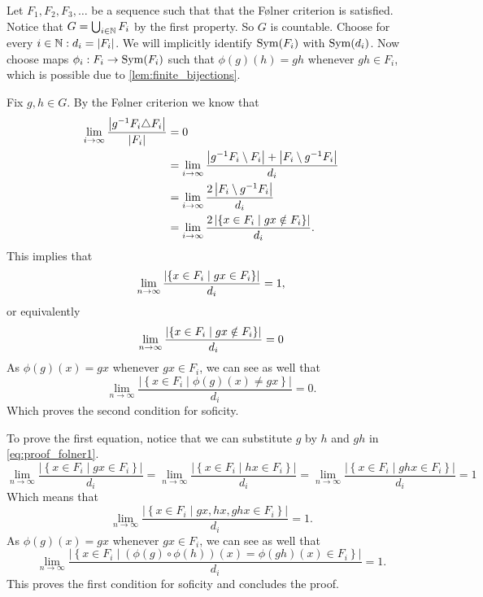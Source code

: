Let $F_1, F_2, F_3, \dots $ be a sequence such that that the Følner criterion is satisfied. Notice that $G = \bigcup_{i \in \mathbb{N}} F_i$ by the first property. So $G$ is countable. 
Choose for every $i \in \mathbb{N}: d_i = |F_i|$. We will implicitly identify $\operatorname{Sym}(F_i)$ with $\operatorname{Sym}(d_i)$. Now choose maps $\phi_i: F_i \to \operatorname{Sym}(F_i)$ such that $\phi(g)(h) = gh$ whenever $gh \in F_i$, which is possible due to \cref{lem:finite_bijections}. 

Fix $g, h \in G$. By the Følner criterion we know that 
\begin{align*}
    \lim_{i\to \infty} \frac{\left| g^{-1}F_i \triangle F_i \right|}{\left| F_i \right|} &= 0\\
    &= \lim_{i\to \infty} \frac{\left| g^{-1}F_i \setminus F_i \right| + \left| F_i \setminus g^{-1}F_i \right|}{d_i}\\
    &= \lim_{i\to \infty} \frac{2\left|  F_i \setminus g^{-1}F_i  \right|}{d_i}\\
    &= \lim_{i\to \infty} \frac{2\left| \left\{ x \in F_i \mid gx \notin F_i \right\} \right|}{d_i}. 
\end{align*}
This implies that \begin{equation}
    \lim_{n\to \infty} \frac{\left| \left\{ x \in F_i \mid gx \in F_i \right\} \right|}{d_i} = 1,
\end{equation}
or equivalently 
\begin{equation}\label{eq:proof_folner1}
    \lim_{n\to \infty} \frac{\left| \left\{ x \in F_i \mid gx \notin F_i \right\} \right|}{d_i} = 0
\end{equation}
As $\phi(g)(x) = gx$ whenever $gx \in F_i$, we can see as well that 
$$\lim_{n\to \infty} \frac{\left|\left\{ x \in F_i \mid \phi(g)(x)\ne gx \right\}\right|}{d_i} = 0.$$
Which proves the second condition for soficity. 

To prove the first equation, notice that we can substitute $g$ by $h$ and $gh$ in \cref{eq:proof_folner1}.
$$ \lim_{n\to \infty} \frac{\left|\left\{ x \in F_i \mid gx \in F_i \right\}\right|}{d_i} =
\lim_{n\to \infty} \frac{\left|\left\{ x \in F_i \mid hx \in F_i \right\}\right|}{d_i} =
\lim_{n\to \infty} \frac{\left|\left\{ x \in F_i \mid ghx \in F_i \right\}\right|}{d_i}= 1$$
Which means that 
$$\lim_{n\to \infty} \frac{\left|\left\{ x \in F_i \mid gx,hx,ghx \in F_i \right\}\right|}{d_i}= 1.$$
As $\phi(g)(x) = gx$ whenever $gx \in F_i$, we can see as well that
$$\lim_{n\to \infty} \frac{\left|\left\{ x \in F_i \mid (\phi(g) \circ\phi(h))(x) = \phi(gh)(x) \in F_i \right\}\right|}{d_i}= 1.$$
This proves the first condition for soficity and concludes the proof. 

